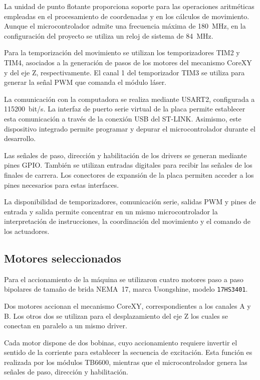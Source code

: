 \documentclass[blue,fullpaper]{ludusofficial}  %
\begin{document}
La unidad de punto flotante proporciona soporte
para las operaciones aritméticas empleadas en el
procesamiento de coordenadas y en los cálculos
de movimiento. Aunque el microcontrolador admite
una frecuencia máxima de 180~MHz, en la configuración
del proyecto se utiliza un reloj de sistema
de 84~MHz.

Para la temporización del movimiento se utilizan
los temporizadores TIM2 y TIM4, asociados a la
generación de pasos de los motores del mecanismo
CoreXY y del eje Z, respectivamente. El canal 1
del temporizador TIM3 se utiliza para generar
la señal PWM que comanda el módulo láser.

La comunicación con la computadora se realiza
mediante USART2, configurada a 115200~bit/s.
La interfaz de puerto serie virtual de la placa
permite establecer esta comunicación a través
de la conexión USB del ST-LINK. Asimismo, este
dispositivo integrado permite programar y depurar
el microcontrolador durante el desarrollo.

Las señales de paso, dirección y habilitación
de los drivers se generan mediante pines GPIO.
También se utilizan entradas digitales para
recibir las señales de los finales de carrera.
Los conectores de expansión de la placa permiten
acceder a los pines necesarios para estas interfaces.

La disponibilidad de temporizadores, comunicación
serie, salidas PWM y pines de entrada y salida
permite concentrar en un mismo microcontrolador
la interpretación de instrucciones, la coordinación
del movimiento y el comando de los actuadores.

\subsection{Motores seleccionados}
\label{subsec:motores-seleccionados}
Para el accionamiento de la máquina se utilizaron
cuatro motores paso a paso bipolares de tamaño
de brida NEMA~17, marca Usongshine, modelo
\texttt{17HS3401}.

Dos motores accionan el mecanismo CoreXY,
correspondientes a los canales A y B. Los otros
dos se utilizan para el desplazamiento del eje Z
los cuales se conectan en paralelo a un mismo driver.

Cada motor dispone de dos bobinas, cuyo accionamiento
requiere invertir el sentido de la corriente
para establecer la secuencia de excitación.
Esta función es realizada por los módulos TB6600,
mientras que el microcontrolador genera las señales
de paso, dirección y habilitación.
\end{document}
